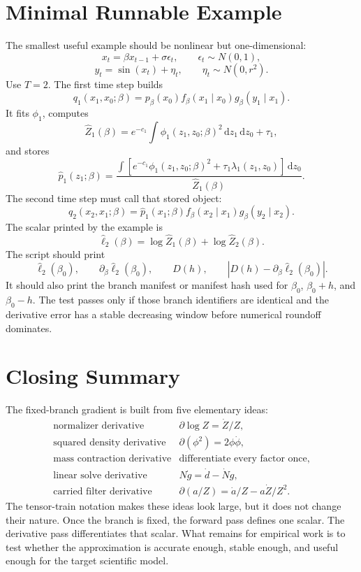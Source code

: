 \documentclass[11pt]{article}
\theoremstyle{remark}
\newcommand{\dd}{\,\mathrm d}
\newcommand{\widehatell}{\widehat\ell}
\begin{document}
\section{Minimal Runnable Example}

The smallest useful example should be nonlinear but one-dimensional:
\[
    x_t=\beta x_{t-1}+\sigma\epsilon_t,
    \qquad
    \epsilon_t\sim N(0,1),
    \tag{102}
\]
\[
    y_t=\sin(x_t)+\eta_t,
    \qquad
    \eta_t\sim N(0,r^2).
    \tag{103}
\]
Use \(T=2\).  The first time step builds
\[
    q_1(x_1,x_0;\beta)
    =
    p_\beta(x_0)
    f_\beta(x_1\mid x_0)
    g_\beta(y_1\mid x_1).
    \tag{104}
\]
It fits \(\phi_1\), computes
\[
    \widehat Z_1(\beta)=e^{-c_1}\int \phi_1(z_1,z_0;\beta)^2
    \dd z_1\dd z_0+\tau_1,
    \tag{105}
\]
and stores
\[
    \widehat p_1(z_1;\beta)
    =
    \frac{\int
    \left[e^{-c_1}\phi_1(z_1,z_0;\beta)^2+\tau_1\lambda_1(z_1,z_0)\right]
    \dd z_0}
    {\widehat Z_1(\beta)}.
    \tag{106}
\]
The second time step must call that stored object:
\[
    q_2(x_2,x_1;\beta)
    =
    \widehat p_1(x_1;\beta)
    f_\beta(x_2\mid x_1)
    g_\beta(y_2\mid x_2).
    \tag{107}
\]
The scalar printed by the example is
\[
    \widehatell_2(\beta)
    =
    \log\widehat Z_1(\beta)
    +
    \log\widehat Z_2(\beta).
    \tag{108}
\]
The script should print
\[
    \widehatell_2(\beta_0),
    \qquad
    \partial_\beta\widehatell_2(\beta_0),
    \qquad
    D(h),
    \qquad
    |D(h)-\partial_\beta\widehatell_2(\beta_0)|.
    \tag{109}
\]
It should also print the branch manifest or manifest hash used for
\(\beta_0\), \(\beta_0+h\), and \(\beta_0-h\).  The test passes only if those
branch identifiers are identical and the derivative error has a stable
decreasing window before numerical roundoff dominates.

\section{Closing Summary}

The fixed-branch gradient is built from five elementary ideas:
\[
\begin{array}{ll}
\text{normalizer derivative} & \partial\log Z=\dot Z/Z,\\[2mm]
\text{squared density derivative} & \partial(\phi^2)=2\phi\dot\phi,\\[2mm]
\text{mass contraction derivative} & \text{differentiate every factor once},\\[2mm]
\text{linear solve derivative} & N\dot g=\dot d-\dot N g,\\[2mm]
\text{carried filter derivative} & \partial(a/Z)=\dot a/Z-a\dot Z/Z^2.
\end{array}
\tag{110}
\]
The tensor-train notation makes these ideas look large, but it does not change
their nature.  Once the branch is fixed, the forward pass defines one scalar.
The derivative pass differentiates that scalar.  What remains for empirical
work is to test whether the approximation is accurate enough, stable enough,
and useful enough for the target scientific model.
\end{document}
